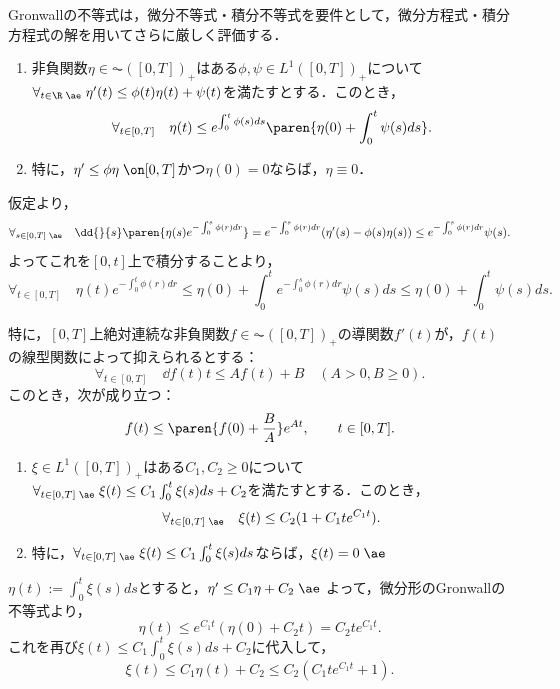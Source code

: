 \documentclass[uplatex,dvipdfmx]{jsreport}
\begin{document}
\begin{tcolorbox}[colframe=ForestGreen, colback=ForestGreen!10!white,breakable,colbacktitle=ForestGreen!40!white,coltitle=black,fonttitle=\bfseries\sffamily,
title=]
    Gronwallの不等式は，微分不等式・積分不等式を要件として，微分方程式・積分方程式の解を用いてさらに厳しく評価する．
\end{tcolorbox}

\begin{lemma}\mbox{}
    \begin{enumerate}
        \item 非負関数$\eta\in\AC([0,T])_+$はある$\phi,\psi\in L^1([0,T])_+$について$\forall_{t\in\R\;\ae}\;\eta'(t)\le\phi(t)\eta(t)+\psi(t)$を満たすとする．このとき，
        \[\forall_{t\in[0,T]}\quad\eta(t)\le e^{\int^t_0\phi(s)ds}\paren{\eta(0)+\int^t_0\psi(s)ds}.\]
        \item 特に，$\eta'\le\phi\eta\;\on[0,T]$かつ$\eta(0)=0$ならば，$\eta\equiv0$．
    \end{enumerate}
\end{lemma}
\begin{Proof}
    仮定より，
    \[\forall_{s\in[0,T]\;\ae}\quad\dd{}{s}\paren{\eta(s)e^{-\int^s_0\phi(r)dr}}=e^{-\int^s_0\phi(r)dr}(\eta'(s)-\phi(s)\eta(s))\le e^{-\int^s_0\phi(r)dr}\psi(s).\]
    よってこれを$[0,t]$上で積分することより，
    \[\forall_{t\in[0,T]}\quad\eta(t)e^{-\int^t_0\phi(r)dr}\le\eta(0)+\int^t_0e^{-\int^s_0\phi(r)dr}\psi(s)ds\le\eta(0)+\int^t_0\psi(s)ds.\]
\end{Proof}

\begin{corollary}
    特に，$[0,T]$上絶対連続な非負関数$f\in\AC([0,T])_+$の導関数$f'(t)$が，$f(t)$の線型関数によって抑えられるとする：
    \[\forall_{t\in [0,T]}\quad\dd{f(t)}{t}\le Af(t)+B\quad(A>0,B\ge0).\]
    このとき，次が成り立つ：
    \[f(t)\le\paren{f(0)+\frac{B}{A}}e^{At},\qquad t\in[0,T].\]
\end{corollary}

\begin{lemma}\mbox{}
    \begin{enumerate}
        \item $\xi\in L^1([0,T])_+$はある$C_1,C_2\ge0$について$\forall_{t\in[0,T]\;\ae}\;\xi(t)\le C_1\int^t_0\xi(s)ds+C_2$を満たすとする．このとき，
        \[\forall_{t\in[0,T]\;\ae}\quad\xi(t)\le C_2(1+C_1te^{C_1t}).\]
        \item 特に，$\forall_{t\in[0,T]\;\ae}\;\xi(t)\le C_1\int^t_0\xi(s)ds$ならば，$\xi(t)=0\;\ae$
    \end{enumerate}
\end{lemma}
\begin{Proof}
    $\eta(t):=\int^t_0\xi(s)ds$とすると，$\eta'\le C_1\eta+C_2\;\ae$
    よって，微分形のGronwallの不等式より，
    \[\eta(t)\le e^{C_1t}(\eta(0)+C_2t)=C_2te^{C_1t}.\]
    これを再び$\xi(t)\le C_1\int^t_0\xi(s)ds+C_2$に代入して，
    \[\xi(t)\le C_1\eta(t)+C_2\le C_2(C_1te^{C_1t}+1).\]
\end{Proof}
\end{document}
